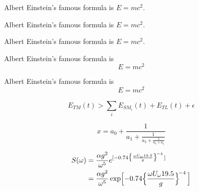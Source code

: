 \documentclass[]{article} %
\begin{document}
	Albert Einstein's famous formula is \(E=mc^2\). 

	Albert Einstein's famous formula is $E=mc^2$. 

	Albert Einstein's famous formula is \begin{math}E=mc^2\end{math}.

	Albert Einstein's famous formula is 
	\begin{equation}
		E=mc^2
	\end{equation}

	Albert Einstein's famous formula is 
	\begin{equation*}
		E=mc^2
	\end{equation*}

	\begin{equation}
		E_{TM}(t)>\sum_{i}^{} E_{SM_i} (t) + E_{TL}(t) + \epsilon 
		\label{eq}
	\end{equation}

	\begin{equation}
	  x = a_0 + \frac{1}{\displaystyle a_1 
	    + \frac{1}{\displaystyle a_2 
	    + \frac{1}{\displaystyle a_3 + a_4}}}
	\end{equation}

	\begin{align*}
			S(\omega) 
			&= \frac{\alpha g^2}{\omega^5} e^{[ -0.74\bigl\{\frac{\omega U_\omega 19.5}{g}\bigr\}^{\!-4}\,]} \\
			&= \frac{\alpha g^2}{\omega^5} \exp\Bigl[ -0.74\Bigl\{\frac{\omega U_\omega 19.5}{g}\Bigr\}^{\!-4}\,\Bigr] 
	\end{align*}
\end{document}
